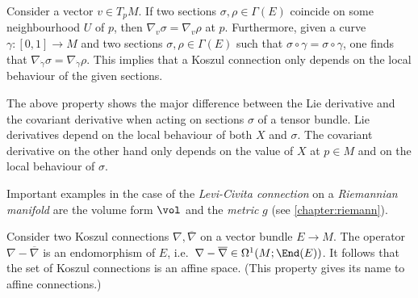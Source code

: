     \begin{property}
        Consider a vector $v\in T_pM$. If two sections $\sigma,\rho\in\Gamma(E)$ coincide on some neighbourhood $U$ of $p$, then $\nabla_v\sigma=\nabla_v\rho$ at $p$. Furthermore, given a curve $\gamma:[0,1]\rightarrow M$ and two sections $\sigma,\rho\in\Gamma(E)$ such that $\sigma\circ\gamma=\sigma\circ\gamma$, one finds that $\nabla_{\dot\gamma}\sigma=\nabla_{\dot\gamma}\rho$. This implies that a Koszul connection only depends on the local behaviour of the given sections.
    \end{property}
    \begin{remark}
        The above property shows the major difference between the Lie derivative and the covariant derivative when acting on sections $\sigma$ of a tensor bundle. Lie derivatives depend on the local behaviour of both $X$ and $\sigma$. The covariant derivative on the other hand only depends on the value of $X$ at $p\in M$ and on the local behaviour of $\sigma$.
    \end{remark}

    \begin{example}
        Important examples in the case of the \textit{Levi-Civita connection} on a \textit{Riemannian manifold} are the volume form $\vol$ and the \textit{metric} $g$ (see \cref{chapter:riemann}).
    \end{example}

    \begin{property}[Affinity]
        Consider two Koszul connections $\nabla,\overline\nabla$ on a vector bundle $E\rightarrow M$. The operator $\nabla-\overline\nabla$ is an endomorphism of $E$, i.e.~$\nabla-\overline\nabla\in\Omega^1(M;\End(E))$. It follows that the set of Koszul connections is an affine space. (This property gives its name to affine connections.)
    \end{property}

